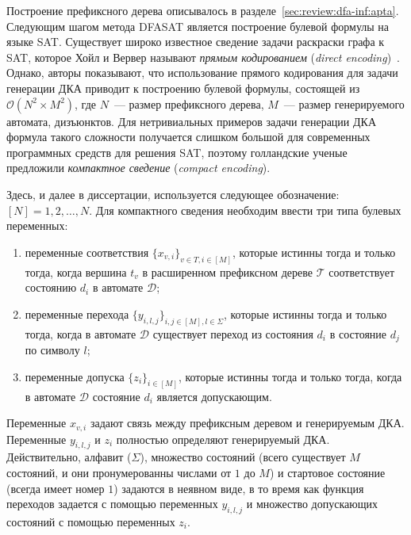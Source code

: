 Построение префиксного дерева описывалось в разделе~\ref{sec:review:dfa-inf:apta}.
Следующим шагом метода DFASAT является построение булевой формулы на языке SAT.
Существует широко известное сведение задачи раскраски графа к SAT, которое Хойл и Вервер называют \emph{прямым кодированием} (\emph{direct encoding})~\cite{DBLP:conf/cp/Walsh00}.
Однако, авторы показывают, что использование прямого кодирования для задачи генерации ДКА приводит к построению булевой формулы, состоящей из $\mathcal{O}\left(N^{2} \times M^{2}\right)$, где $N$~--- размер префиксного дерева, $M$~--- размер генерируемого автомата, дизъюнктов.
Для нетривиальных примеров задачи генерации ДКА формула такого сложности получается слишком большой для современных программных средств для решения SAT, поэтому голландские ученые предложили \emph{компактное сведение} (\emph{compact encoding}).

Здесь, и далее в диссертации, используется следующее обозначение: $\left[N\right] = {1,2,\ldots,N}$.
Для компактного сведения необходим ввести три типа булевых переменных:
\begin{enumerate}
  \item переменные соответствия $\{x_{v,i}\}_{v \in T, i \in \left[M\right]}$, которые истинны тогда и только тогда, когда вершина $t_{v}$ в расширенном префиксном дереве $\mathcal{T}$ соответствует состоянию $d_{i}$ в автомате $\mathcal{D}$;
  \item переменные перехода $\{y_{i,l,j}\}_{i,j \in \left[M\right],l \in \Sigma}$, которые истинны тогда и только тогда, когда в автомате $\mathcal{D}$ существует переход из состояния $d_{i}$ в состояние $d_{j}$ по символу $l$;
  \item переменные допуска $\{z_{i}\}_{i \in \left[M\right]}$, которые истинны тогда и только тогда, когда в автомате $\mathcal{D}$ состояние $d_{i}$ является допускающим.
\end{enumerate}

Переменные $x_{v,i}$ задают связь между префиксным деревом и генерируемым ДКА.
Переменные $y_{i,l,j}$ и $z_{i}$ полностью определяют генерируемый ДКА.
Действительно, алфавит ($\Sigma$), множество состояний (всего существует $M$ состояний, и они пронумерованны числами от $1$ до $M$) и стартовое состояние (всегда имеет номер $1$) задаются в неявном виде, в то время как функция переходов задается с помощью переменных $y_{i,l,j}$ и множество допускающих состояний с помощью переменных $z_{i}$.

